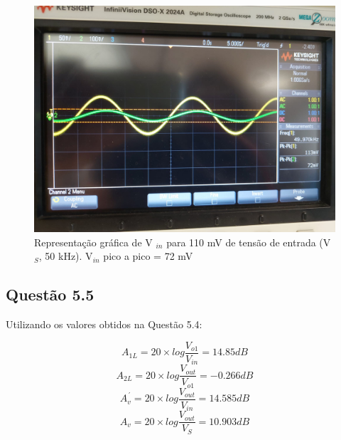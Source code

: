 \documentclass[a4paper,12pt]{article}
\begin{document}
				\begin{figure}[H]
  					\centering
  					\captionsetup{justification=centering}
  					\includegraphics[scale=0.1\textscale]  {5.4-3.jpeg}
					\caption{Representação gráfica de V $_{in}$ para 110 mV de tensão de entrada (V$_S$, 50 kHz). V$_{in}$ pico a pico = 72 mV}
				\end{figure}



			
			\subsection{Questão 5.5}
				Utilizando os valores obtidos na Questão 5.4:
				\begin{center}
					\begin{equation}
						A_{1L}=20 \times log \frac{V_{o1}}{V_{in}} = 14.85 dB
					\end{equation}
					\begin{equation}
						A_{2L}=20 \times log \frac{V_{out}}{V_{o1}} = - 0.266 dB
                                        \end{equation}
					\begin{equation}
						A^{´}_{v}=20 \times log \frac{V_{out}}{V_{in}} = 14.585 dB
                                        \end{equation}
					\begin{equation}
						A_{v}=20 \times log \frac{V_{out}}{V_S} = 10.903 dB
                                        \end{equation}
				\end{center}
\end{document}
